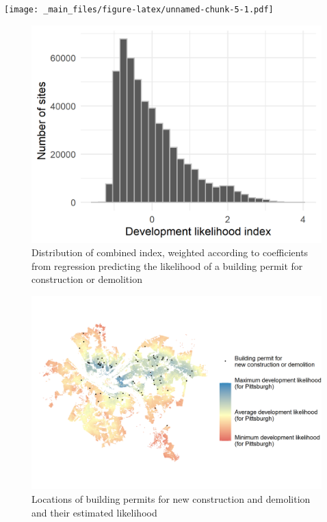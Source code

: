 \documentclass[
]{book}
\begin{document}
\texttt{[image: \_main\_files/figure-latex/unnamed-chunk-5-1.pdf]}

\begin{figure}
\includegraphics[width=1\linewidth]{04_figures/combined-hist} \caption{Distribution of combined index, weighted according to coefficients from regression predicting the likelihood of a building permit for construction or demolition}\label{fig:combined-hist}
\end{figure}

\begin{figure}
\includegraphics[width=1\linewidth]{04_figures/combined-pitt} \caption{Locations of building permits for new construction and demolition and their estimated likelihood}\label{fig:combined-pitt}
\end{figure}
\end{document}
